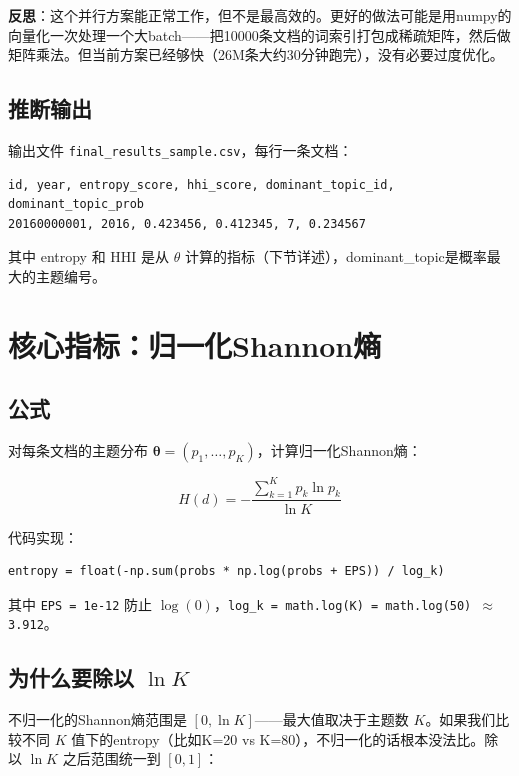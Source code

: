 \documentclass[12pt,a4paper]{ctexart}
\begin{document}
\textbf{反思}：这个并行方案能正常工作，但不是最高效的。更好的做法可能是用numpy的向量化一次处理一个大batch——把10000条文档的词索引打包成稀疏矩阵，然后做矩阵乘法。但当前方案已经够快（26M条大约30分钟跑完），没有必要过度优化。

\subsection{推断输出}

输出文件 \texttt{final\_results\_sample.csv}，每行一条文档：

\begin{verbatim}
id, year, entropy_score, hhi_score, dominant_topic_id, dominant_topic_prob
20160000001, 2016, 0.423456, 0.412345, 7, 0.234567
\end{verbatim}

其中 entropy 和 HHI 是从 $\theta$ 计算的指标（下节详述），dominant\_topic是概率最大的主题编号。


\section{核心指标：归一化Shannon熵}
\label{sec:entropy}

\subsection{公式}

对每条文档的主题分布 $\boldsymbol{\theta} = (p_1, \dots, p_K)$，计算归一化Shannon熵：

\begin{equation}
H(d) = -\frac{\sum_{k=1}^{K} p_k \ln p_k}{\ln K}
\end{equation}

代码实现：
\begin{verbatim}
entropy = float(-np.sum(probs * np.log(probs + EPS)) / log_k)
\end{verbatim}

其中 \texttt{EPS = 1e-12} 防止 $\log(0)$，\texttt{log\_k = math.log(K) = math.log(50) $\approx$ 3.912}。

\subsection{为什么要除以 $\ln K$}

不归一化的Shannon熵范围是 $[0, \ln K]$——最大值取决于主题数 $K$。如果我们比较不同 $K$ 值下的entropy（比如K=20 vs K=80），不归一化的话根本没法比。除以 $\ln K$ 之后范围统一到 $[0, 1]$：
\end{document}
